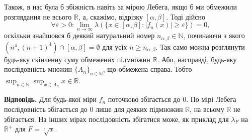 \documentclass[14pt]{extarticle}
\begin{document}
Також, в нас була б збіжність навіть за мірою Лебега, якщо б ми обмежили розглядання не всього $\mathbb{R}$, а, скажімо, відрізку $[\alpha,\beta]$. Тоді дійсно
\[
\forall \varepsilon > 0: \lim_{n \to \infty}\lambda(\{x \in [\alpha,\beta]: |f_n(x)| \geq \varepsilon\}) = 0,
\]
оскільки знайшовся б деякий натуральний номер $n_{\alpha,\beta} \in \mathbb{N}$, починаючи з якого $(n^4,(n+1)^4) \cap [\alpha,\beta] = \emptyset$ для усіх $n \geq n_{\alpha,\beta}$. Так само можна розглянути будь-яку скінченну суму обмежених підмножин $\mathbb{R}$. Або, насправді, будь-яку послідовність множин $\{A_n\}_{n \in \mathbb{N}}$, що обмежена справа. Тобто $\sup_{n \in \mathbb{N}}\sup_{x \in A_n} x \in \mathbb{R}$.

\textbf{Відповідь.} Для будь-якої міри $f_n$ поточково збігається до $0$. По мірі Лебега послідовність збігається до $0$ лише для деяких підмножин $\mathbb{R}$, на всьому $\mathbb{R}$ не збігається. На інших мірах послідовність збігатися може, як приклад для $\lambda_F$ на $\mathbb{R}^+$ для $F=\sqrt[5]{x}$.
\end{document}
